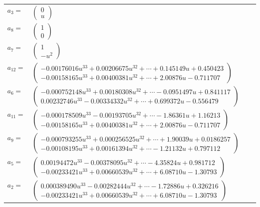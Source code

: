 \documentclass[1p]{elsarticle_modified}
\theoremstyle{definition}
\begin{document}
\begin{tabular}{m{7pt} m{180pt} m{7pt} m{180pt} }
\flushright $a_{3}=$&$\begin{pmatrix}0\\u\end{pmatrix}$ \\
\flushright $a_{8}=$&$\begin{pmatrix}1\\0\end{pmatrix}$ \\
\flushright $a_{7}=$&$\begin{pmatrix}1\\- u^2\end{pmatrix}$ \\
\flushright $a_{12}=$&$\begin{pmatrix}-0.00176016 u^{33}+0.00206675 u^{32}+\cdots+0.145149 u+0.450423\\-0.00158165 u^{33}+0.00400381 u^{32}+\cdots+2.00876 u-0.711707\end{pmatrix}$ \\
\flushright $a_{6}=$&$\begin{pmatrix}-0.000752148 u^{33}+0.00180308 u^{32}+\cdots-0.0951497 u+0.841117\\0.00232746 u^{33}-0.00334332 u^{32}+\cdots+0.699372 u-0.556479\end{pmatrix}$ \\
\flushright $a_{11}=$&$\begin{pmatrix}-0.000178509 u^{33}-0.00193705 u^{32}+\cdots-1.86361 u+1.16213\\-0.00158165 u^{33}+0.00400381 u^{32}+\cdots+2.00876 u-0.711707\end{pmatrix}$ \\
\flushright $a_{9}=$&$\begin{pmatrix}-0.000793255 u^{33}+0.000256525 u^{32}+\cdots+1.90039 u+0.0186257\\-0.00108195 u^{33}+0.00161394 u^{32}+\cdots-1.21132 u+0.797112\end{pmatrix}$ \\
\flushright $a_{5}=$&$\begin{pmatrix}0.00194472 u^{33}-0.00378095 u^{32}+\cdots-4.35824 u+0.981712\\-0.00233421 u^{33}+0.00660539 u^{32}+\cdots+6.08710 u-1.30793\end{pmatrix}$ \\
\flushright $a_{2}=$&$\begin{pmatrix}0.000389490 u^{33}-0.00282444 u^{32}+\cdots-1.72886 u+0.326216\\-0.00233421 u^{33}+0.00660539 u^{32}+\cdots+6.08710 u-1.30793\end{pmatrix}$ \\

\end{tabular}
\end{document}
